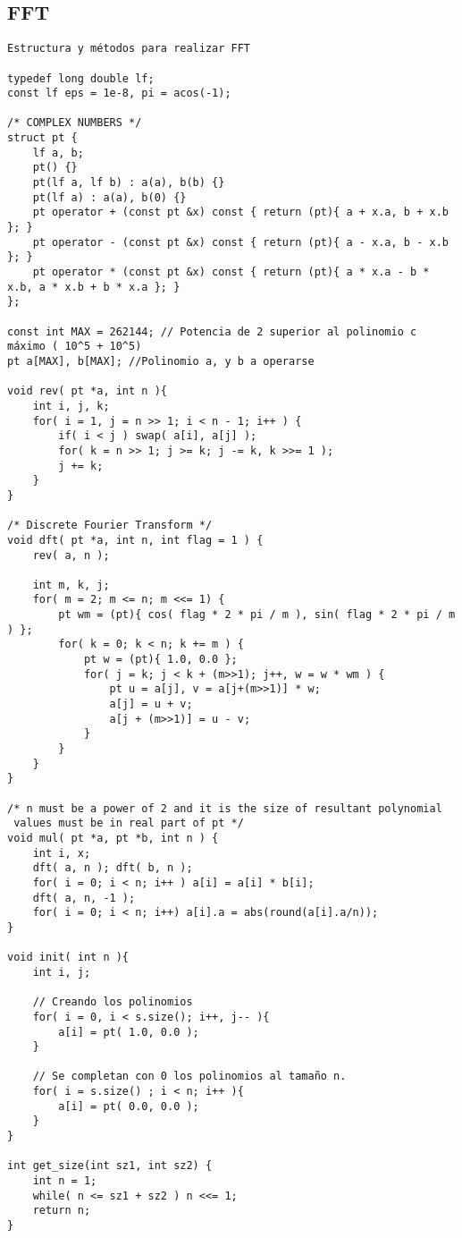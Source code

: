 \documentclass[10pt,letterpaper,twocolumn,twosided]{article}
\begin{document}
\subsection{FFT}
\begin{lstlisting}
Estructura y métodos para realizar FFT

typedef long double lf;
const lf eps = 1e-8, pi = acos(-1);

/* COMPLEX NUMBERS */
struct pt {
    lf a, b;
    pt() {}
    pt(lf a, lf b) : a(a), b(b) {}
    pt(lf a) : a(a), b(0) {}
    pt operator + (const pt &x) const { return (pt){ a + x.a, b + x.b }; }
    pt operator - (const pt &x) const { return (pt){ a - x.a, b - x.b }; }
    pt operator * (const pt &x) const { return (pt){ a * x.a - b * x.b, a * x.b + b * x.a }; }
};
 
const int MAX = 262144; // Potencia de 2 superior al polinomio c máximo ( 10^5 + 10^5)
pt a[MAX], b[MAX]; //Polinomio a, y b a operarse
 
void rev( pt *a, int n ){
    int i, j, k;
    for( i = 1, j = n >> 1; i < n - 1; i++ ) {
        if( i < j ) swap( a[i], a[j] );
        for( k = n >> 1; j >= k; j -= k, k >>= 1 );
        j += k;
    }
}
 
/* Discrete Fourier Transform */
void dft( pt *a, int n, int flag = 1 ) {
    rev( a, n );
 
    int m, k, j;
    for( m = 2; m <= n; m <<= 1) {
        pt wm = (pt){ cos( flag * 2 * pi / m ), sin( flag * 2 * pi / m ) };
        for( k = 0; k < n; k += m ) {
            pt w = (pt){ 1.0, 0.0 };
            for( j = k; j < k + (m>>1); j++, w = w * wm ) {
                pt u = a[j], v = a[j+(m>>1)] * w;
                a[j] = u + v;
                a[j + (m>>1)] = u - v;
            }
        }
    }
}
 
/* n must be a power of 2 and it is the size of resultant polynomial
 values must be in real part of pt */
void mul( pt *a, pt *b, int n ) {
	int i, x;
    dft( a, n ); dft( b, n );
    for( i = 0; i < n; i++ ) a[i] = a[i] * b[i];
    dft( a, n, -1 );
    for( i = 0; i < n; i++) a[i].a = abs(round(a[i].a/n));
}
 
void init( int n ){
	int i, j;
 
	// Creando los polinomios
	for( i = 0, i < s.size(); i++, j-- ){
		a[i] = pt( 1.0, 0.0 );
	}
 
	// Se completan con 0 los polinomios al tamaño n.
	for( i = s.size() ; i < n; i++ ){
		a[i] = pt( 0.0, 0.0 );
	}
}
 
int get_size(int sz1, int sz2) {
    int n = 1;
    while( n <= sz1 + sz2 ) n <<= 1;
    return n;
}
 \end{lstlisting}
\end{document}
